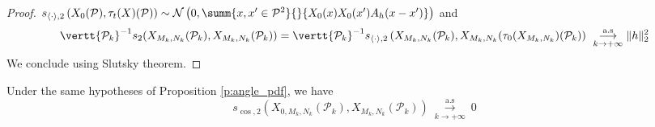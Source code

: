 \begin{proof}
  $s_{\langle \cdot \rangle, 2}\left( X_0(\mathcal{P}),
    \tau_t(X)(\mathcal{P})\right) \sim \mathcal{N}\left(0,\summ{x,x' \in
      \mathcal{P}^2}{}{X_0(x)X_0(x')A_h(x-x')} \right)$ and
  \[\vertt{\mathcal{P}_k}^{-1}
    s_{2}(X_{M_k,N_k}(\mathcal{P}_k),X_{M_k,N_k}(\mathcal{P}_k)) =
    \vertt{\mathcal{P}_k}^{-1} s_{\langle \cdot
      \rangle,2}\left(X_{M_k,N_k}(\mathcal{P}_k),
      X_{M_k,N_k}(\tau_0(X_{M_k,N_k})(\mathcal{P}_k) \right) \ \underset{k
      \rightarrow +\infty}{\overset{\text{a.s}}{\longrightarrow}} \| h\|_2^2\] We
  conclude using Slutsky theorem.
\end{proof}
\begin{prop}
  Under the same hypotheses of Proposition \ref{p:angle_pdf}, we have
  \[ s_{\cos, 2} \left( X_{0,
        M_k,N_k}(\mathcal{P}_k),X_{M_k,N_k}(\mathcal{P}_k)\right) \
    \overset{\text{a.s}}{\underset{k \rightarrow +\infty}{\longrightarrow}} \
    0 \]
\end{prop}
